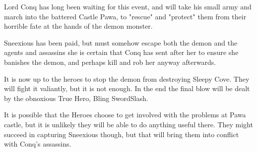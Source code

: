 Lord Conq has long been waiting for this event, and will take his small army and march into the battered Castle Pawa, to "rescue" and "protect" them from their horrible fate at the hands of the demon monster.

Sneexious has been paid, but must somehow escape both the demon and the agents and assassins she is certain that Conq has sent after her to ensure she banishes the demon, and perhaps kill and rob her anyway afterwards.

It is now up to the heroes to stop the demon from destroying Sleepy Cove. They will fight it valiantly, but it is not enough. In the end the final blow will be dealt by the obnoxious True Hero, Bling SwordSlash.

It is possible that the Heroes choose to get involved with the problems at Pawa castle, but it is unlikely they will be able to do anything useful there. They might succeed in capturing Sneexious though, but that will bring them into conflict with Conq's assassins.




